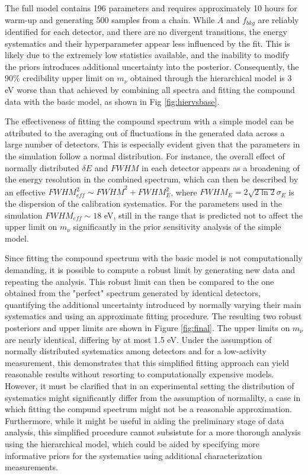 The full model contains 196 parameters and requires approximately 10 hours for warm-up and generating 500 samples
from a chain. While $A$ and $f_{bkg}$ are reliably identified for each detector, and there are no divergent transitions, the
energy systematics and their hyperparameter appear less influenced by the fit. This is likely due to the extremely low
statistics available, and the inability to modify the priors introduces additional uncertainty into the posterior.
Consequently, the 90\% credibility upper limit on $m_\nu$ obtained through the hierarchical model is 3 eV worse than that achieved by combining all spectra and
fitting the compound data with the basic model, as shown in Fig \ref{fig:hiervsbase}.

The effectiveness of fitting the compound spectrum with a simple model can be attributed to the averaging out of
fluctuations in the generated data across a large number of detectors. This is especially evident given that the parameters
in the simulation follow a normal distribution. For instance, the overall effect of normally distributed $\delta E$ and $FWHM$ in each detector
appears as a broadening of the energy resolution in the combined spectrum, which can then be described by an effective
$FWHM_{eff}^2\sim\overline{FWHM}^2+FWHM_E^2$, where $FWHM_E=2\sqrt{2\ln 2}\sigma_E $ is the dispersion of the calibration
systematics. For the parameters used in the simulation $FWHM_{eff}\sim {18}$ eV, still in the range that is predicted
not to affect the upper limit on $m_\nu$ significantly in the prior sensitivity analysis of the simple model.



Since fitting the compound spectrum with the basic model is not computationally demanding, it is possible to compute a
robust limit by generating new data and repeating the analysis. This robust limit can then be compared to the one
obtained from the "perfect" spectrum generated by identical detectors, quantifying the additional uncertainty introduced
by normally varying their main systematics and using an approximate fitting procedure. The resulting two robust
posteriors and upper limits are shown in Figure \ref{fig:final}. The upper limits on $m_\nu$ are nearly identical, differing by at most 1.5 eV. Under the assumption of
normally distributed systematics among detectors and for a low-activity measurement, this demonstrates that this
simplified fitting approach can yield reasonable results without resorting to computationally expensive models. However,
it must be clarified that in an experimental setting the distribution of systematics might significantly differ from
the assumption of
normalilty, a case in which fitting the compund spectrum might not be a reasonable approximation. Furthermore,
while it might
be useful in aiding the preliminary stage of data analysis, this simplified procedure cannot subsistute
for a more thorough analysis using the hierarchical model, which could be aided by specifying more informative priors
for the systematics using additional characterization measurements.


